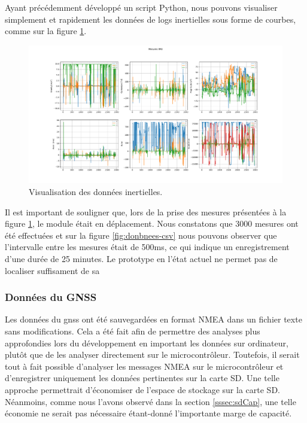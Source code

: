 Ayant précédemment développé un script Python, nous pouvons visualiser simplement et rapidement les données de logs inertielles sous forme de courbes, comme sur la figure \ref{fig:mesures}.

\begin{figure}[h]
	\centering
	\includegraphics[width=1\linewidth]{../figures/application/mesures}
	\caption{Visualisation des données inertielles.}
	\label{fig:mesures}
\end{figure}

Il est important de souligner que, lors de la prise des mesures présentées à la figure \ref{fig:mesures}, le module était en déplacement. Nous constatons que 3000 mesures ont été effectuées et sur la figure \ref{fig:donbnees-csv} nous pouvons observer que l'intervalle entre les mesures était de 500ms, ce qui indique un enregistrement d'une durée de 25 minutes. Le prototype en l'état actuel ne permet pas de localiser suffisament de sa

\subsubsection{Données du GNSS} 

Les données du \gls{gnss} ont été sauvegardées en format NMEA dans un fichier texte sans modifications. Cela a été fait afin de permettre des analyses plus approfondies lors du développement en important les données sur ordinateur, plutôt que de les analyser directement sur le microcontrôleur. Toutefois, il serait tout à fait possible d'analyser les messages NMEA sur le microcontrôleur et d'enregistrer uniquement les données pertinentes sur la carte SD. Une telle approche permettrait d'économiser de l'espace de stockage sur la carte SD. Néanmoins, comme nous l'avons observé dans la section \ref{sssec:sdCap}, une telle économie ne serait pas nécessaire étant-donné l'importante marge de capacité. 

